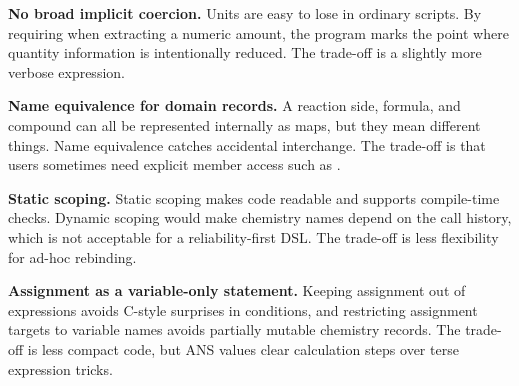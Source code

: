 \textbf{No broad implicit coercion.} Units are easy to lose in ordinary scripts. By requiring  when extracting a numeric amount, the program marks the point where quantity information is intentionally reduced. The trade-off is a slightly more verbose expression.

\textbf{Name equivalence for domain records.} A reaction side, formula, and compound can all be represented internally as maps, but they mean different things. Name equivalence catches accidental interchange. The trade-off is that users sometimes need explicit member access such as .

\textbf{Static scoping.} Static scoping makes code readable and supports compile-time checks. Dynamic scoping would make chemistry names depend on the call history, which is not acceptable for a reliability-first DSL. The trade-off is less flexibility for ad-hoc rebinding.

\textbf{Assignment as a variable-only statement.} Keeping assignment out of expressions avoids C-style surprises in conditions, and restricting assignment targets to variable names avoids partially mutable chemistry records. The trade-off is less compact code, but ANS values clear calculation steps over terse expression tricks.


